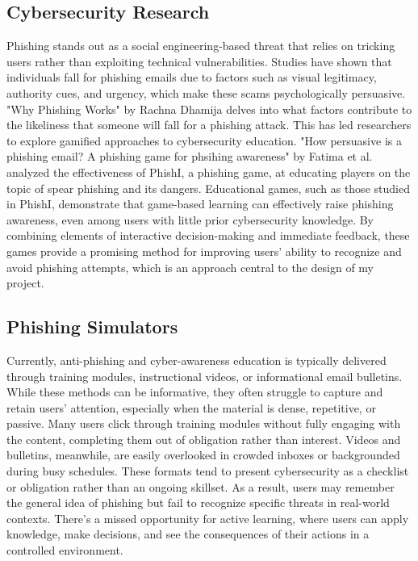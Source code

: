 \documentclass[10pt,twocolumn]{article}
\begin{document}
\subsection{Cybersecurity Research}
Phishing stands out as a social engineering-based threat that relies on tricking users rather than exploiting technical vulnerabilities. Studies have shown that individuals fall for phishing emails due to factors such as visual legitimacy, authority cues, and urgency, which make these scams psychologically persuasive. "Why Phishing Works" by Rachna Dhamija delves into what factors contribute to the likeliness that someone will fall for a phishing attack. This has led researchers to explore gamified approaches to cybersecurity education. "How persuasive is a phishing email? A phishing game for phsihing awareness" by Fatima et al. analyzed the effectiveness of PhishI, a phishing game, at educating players on the topic of spear phishing and its dangers. \cite{Fatima} Educational games, such as those studied in PhishI, demonstrate that game-based learning can effectively raise phishing awareness, even among users with little prior cybersecurity knowledge. By combining elements of interactive decision-making and immediate feedback, these games provide a promising method for improving users’ ability to recognize and avoid phishing attempts, which is an approach central to the design of my project.

\subsection{Phishing Simulators}
Currently, anti-phishing and cyber-awareness education is typically delivered through training modules, instructional videos, or informational email bulletins. While these methods can be informative, they often struggle to capture and retain users' attention, especially when the material is dense, repetitive, or passive. Many users click through training modules without fully engaging with the content, completing them out of obligation rather than interest. Videos and bulletins, meanwhile, are easily overlooked in crowded inboxes or backgrounded during busy schedules.
These formats tend to present cybersecurity as a checklist or obligation rather than an ongoing skillset. As a result, users may remember the general idea of phishing but fail to recognize specific threats in real-world contexts. There's a missed opportunity for active learning, where users can apply knowledge, make decisions, and see the consequences of their actions in a controlled environment.
\end{document}
